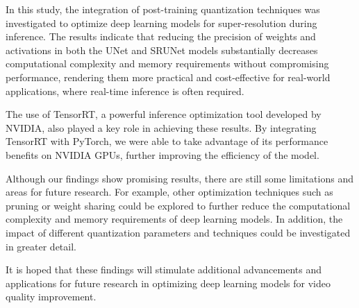 \label{chap:Conclusions}


In this study, the integration of post-training quantization techniques was investigated to optimize deep learning models for super-resolution during inference. The results indicate that reducing the precision of weights and activations in both the UNet and SRUNet models substantially decreases computational complexity and memory requirements without compromising performance, rendering them more practical and cost-effective for real-world applications, where real-time inference is often required.

The use of TensorRT, a powerful inference optimization tool developed by NVIDIA, also played a key role in achieving these results. By integrating TensorRT with PyTorch, we were able to take advantage of its performance benefits on NVIDIA GPUs, further improving the efficiency of the model.

Although our findings show promising results, there are still some limitations and areas for future research. For example, other optimization techniques such as pruning or weight sharing could be explored to further reduce the computational complexity and memory requirements of deep learning models. In addition, the impact of different quantization parameters and techniques could be investigated in greater detail.

It is hoped that these findings will stimulate additional advancements and applications for future research in optimizing deep learning models for video quality improvement.


